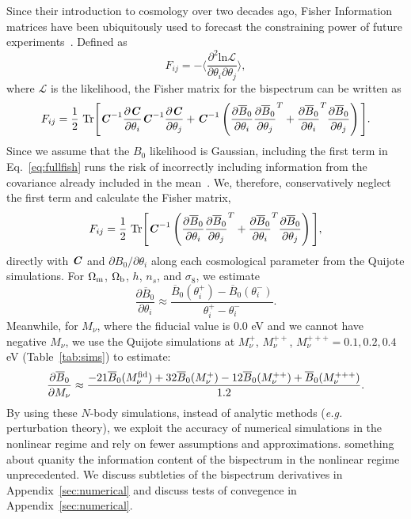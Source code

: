 \documentclass[12pt, letterpaper, preprint]{aastex62}
\newcommand{\Om}{\Omega_{\rm m}}
\newcommand{\Ob}{\Omega_{\rm b}}
\newcommand{\smnu}{M_\nu}
\newcommand{\sig}{\sigma_8}
\newcommand{\bfi}[1]{\textbf{\textit{#1}}}
\newcommand{\parti}[1]{\frac{\partial #1}{\partial \theta_i}}
\newcommand{\partj}[1]{\frac{\partial #1}{\partial \theta_j}}
\newcommand{\beq}{\begin{equation}}
\newcommand{\eeq}{\end{equation}}
\newcommand{\ch}[1]{{\color{orange}{\bf CH:} #1}}
\begin{document}
Since their introduction to cosmology over two decades ago, Fisher Information 
matrices have been ubiquitously used to forecast the constraining power of future 
experiments~\citep[\emph{e.g.}][]{jungman1996,tegmark1997a,dodelson2003,heavens2009,verde2010}. 
Defined as 
\beq 
F_{ij} = - \bigg \langle \frac{\partial^2 \mathrm{ln} \mathcal{L}}{\partial \theta_i \partial \theta_j} \bigg \rangle,
\eeq
where $\mathcal{L}$ is the likelihood, the Fisher matrix for the bispectrum can 
be written as 
\beq \label{eq:fullfish} 
F_{ij} = \frac{1}{2}~\mathrm{Tr} \Bigg[\bfi{C}^{-1}\parti{\bfi{C}}\bfi{C}^{-1}\partj{\bfi{C}} + \bfi{C}^{-1} \left(\parti{\overline{B}_0}\partj{\overline{B}_0}^T + \parti{\overline{B}_0}^T \partj{\overline{B}_0} \right)\Bigg].
\eeq
Since we assume that the $B_0$ likelihood is Gaussian, including the first 
term in Eq.~\ref{eq:fullfish} runs the risk of incorrectly including information 
from the covariance already included in the mean~\citep{carron2013}. We, therefore,
conservatively neglect the first term and calculate the Fisher matrix, 
\beq \label{eq:fisher}
F_{ij} = \frac{1}{2}~\mathrm{Tr} \Bigg[\bfi{C}^{-1} \left(\parti{\overline{B}_0}\partj{\overline{B}_0}^T + \parti{\overline{B}_0}^T \partj{\overline{B}_0} \right)\Bigg],
\eeq
directly with $\bfi{C}$ and $\partial B_0/\partial \theta_i$ along each cosmological 
parameter from the Quijote simulations. For $\Om$, $\Ob$, $h$, $n_s$, and $\sig$, 
we estimate 
\beq \label{eq:dbkdt} 
\frac{\partial \overline{B}_0}{\partial \theta_i} \approx \frac{\overline{B}_0(\theta_i^{+})-\overline{B}_0(\theta_i^{-})}{\theta_i^+ - \theta_i^-}. 
\eeq
Meanwhile, for $\smnu$, where the fiducial value is 0.0 eV and we cannot have 
negative $\smnu$, we use the Quijote simulations at $\smnu^+$, $\smnu^{++}$, 
$\smnu^{+++}=0.1, 0.2, 0.4$ eV (Table~\ref{tab:sims}) to estimate: 
\beq \label{eq:dbkdmnu} 
\frac{\partial \overline{B}_0}{\partial \smnu} \approx \frac{-21\overline{B}_0(\smnu^{\rm fid}) + 
32 \overline{B}_0(\smnu^{+}) - 12 \overline{B}_0(\smnu^{++}) + \overline{B}_0(\smnu^{+++})}{1.2}. 
\eeq
By using these $N$-body simulations, instead of analytic methods (\emph{e.g.} 
perturbation theory), we exploit the accuracy of numerical simulations in the 
nonlinear regime and rely on fewer assumptions and approximations. 
\ch{something about quanity the information content of the bispectrum in the nonlinear regime unprecedented.} 
We discuss subtleties of the bispectrum derivatives in Appendix~\ref{sec:numerical} and 
discuss tests of convegence in Appendix~\ref{sec:numerical}. 
\end{document}
